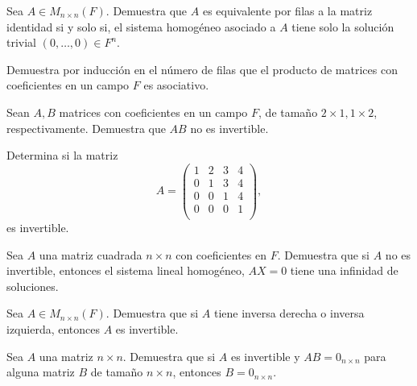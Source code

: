 \documentclass[12pt,a4paper]{book}
\begin{document}
    \begin{ejercicio}
        Sea $A \in M_{n \times n}(F)$. Demuestra que $A$ es equivalente por filas a la matriz identidad si y solo si, el sistema homogéneo asociado a $A$ tiene solo la solución trivial $(0, \dots , 0) \in F^{n}$.
    \end{ejercicio}

    \begin{ejercicio}
        Demuestra por inducción en el número de filas que el producto de matrices con coeficientes en un campo $F$ es asociativo.
    \end{ejercicio}

    \begin{ejercicio}
        Sean $A,B$ matrices con coeficientes en un campo $F$, de tamaño $2 \times 1, 1 \times 2$, respectivamente. Demuestra que $AB$ no es invertible.
    \end{ejercicio}

    \begin{ejercicio}
        Determina si la matriz
        \begin{equation*}
        A =
        \begin{pmatrix}
            1 & 2 & 3 & 4\\
            0 & 1 & 3 & 4\\
            0 & 0 & 1 & 4\\
            0 & 0 & 0 & 1\\
        \end{pmatrix},
        \end{equation*}
        es invertible.
    \end{ejercicio}

    \begin{ejercicio}
        Sea $A$ una matriz cuadrada $n \times n$ con coeficientes en $F$. Demuestra que si $A$ no es invertible, entonces el sistema lineal homogéneo, $AX = 0$ tiene una infinidad de soluciones.
    \end{ejercicio}

    \begin{ejercicio}
        Sea $A \in M_{n \times n}(F)$. Demuestra que si $A$ tiene inversa derecha o inversa izquierda, entonces $A$ es invertible.
    \end{ejercicio}

    \begin{ejercicio}
        Sea $A$ una matriz $n \times n$. Demuestra que si $A$ es invertible y $AB = 0_{n \times n}$ para alguna matriz $B$ de tamaño $n \times n$, entonces $B = 0_{n \times n}$.
    \end{ejercicio}
\end{document}
